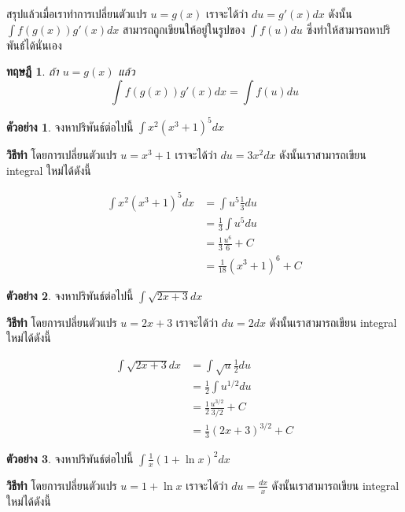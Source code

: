 \documentclass[
]{book}
\newtheorem{theorem}{ทฤษฎี}[chapter]
\theoremstyle{definition}
\theoremstyle{definition}
\newtheorem{example}{ตัวอย่าง}[chapter]
\theoremstyle{definition}
\theoremstyle{definition}
\theoremstyle{remark}
\begin{document}
สรุปแล้วเมื่อเราทำการเปลี่ยนตัวแปร \(u = g(x)\) เราจะได้ว่า \(du = g'(x)dx\) ดังนั้น
\(\int f(g(x)) g'(x) dx\) สามารถถูกเขียนให้อยู่ในรูปของ \(\int f(u)du\)
ซึ่งทำให้สามารถหาปริพันธ์ได้นั่นเอง

\begin{theorem}
ถ้า \(u = g(x)\) แล้ว \[\int f(g(x)) g'(x) dx  = \int f(u) du\]
\end{theorem}

\begin{example}
จงหาปริพันธ์ต่อไปนี้ \(\int x^2 (x^3 + 1)^5 dx\)
\end{example}

\textbf{วิธีทำ} โดยการเปลี่ยนตัวแปร \(u = x^3 + 1\) เราจะได้ว่า \(du = 3x^2 dx\)
ดังนั้นเราสามารถเขียน integral ใหม่ได้ดังนี้

\[
\begin{aligned}
        \int x^2 (x^3 + 1)^5 dx &= \int u^5 \frac{1}{3} du \\
                                &= \frac{1}{3}\int u^5 du\\
                                &= \frac{1}{3} \frac{u^6}{6} + C\\
                                &= \frac{1}{18} (x^3+1)^6 + C
\end{aligned}
\]

\begin{example}
จงหาปริพันธ์ต่อไปนี้ \(\int \sqrt{2x + 3} dx\)
\end{example}

\textbf{วิธีทำ} โดยการเปลี่ยนตัวแปร \(u = 2x + 3\) เราจะได้ว่า \(du = 2 dx\)
ดังนั้นเราสามารถเขียน integral ใหม่ได้ดังนี้

\begin{equation}
\begin{aligned}
        \int \sqrt{2x + 3} dx  &= \int \sqrt{u} \frac{1}{2} du \\
                                &= \frac{1}{2}\int u^{1/2} du\\
                                &= \frac{1}{2} \frac{ u^{3/2}}{3/2} + C\\
                                &= \frac{1}{3} (2x + 3)^{3/2} + C
\end{aligned}
\end{equation}

\begin{example}
จงหาปริพันธ์ต่อไปนี้ \(\int \frac{1}{x} (1+ \ln x)^2 dx\)
\end{example}

\textbf{วิธีทำ} โดยการเปลี่ยนตัวแปร \(u = 1 + \ln x\) เราจะได้ว่า \(du =  \frac{dx}{x}\)
ดังนั้นเราสามารถเขียน integral ใหม่ได้ดังนี้
\end{document}
